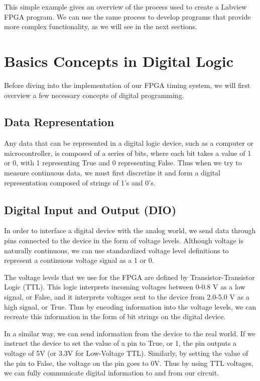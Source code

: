This simple example gives an overview of the process used to create a Labview FPGA program.  We can use the same process to develop programs that provide more complex functionality, as we will see in the next sections.

 
\section{Basics Concepts in Digital Logic}
Before diving into the implementation of our FPGA timing system, we will first overview a few necessary concepts of digital programming.

\subsection{Data Representation} 
Any data that can be represented in a digital logic device, such as a computer
or microcontroller, is composed of a series of bits, where each bit takes a
value of 1 or 0, with 1 representing True and 0 representing False.  Thus when we try to measure continuous data, we must first discretize it and form a digital representation composed of strings of 1's and 0's.

\subsection{Digital Input and Output (DIO)} 
In order to interface a digital device with the analog world, we send data
through pins connected to the device in the form of voltage levels.  Although
voltage is naturally continuous, we can use standardized voltage level
definitions to represent a continuous voltage signal as a 1 or 0.

The voltage levels that we use for the FPGA are defined by Transistor-Transistor Logic (TTL).  This logic interprets incoming voltages between 0-0.8 V as a low signal, or False, and it interprets voltages sent to the device from 2.0-5.0 V as a high signal, or True.  Thus by encoding information into the voltage levels, we can recreate this information in the form of bit strings on the digital device.

In a similar way, we can send information from the device to the real world.
If we instruct the device to set the value of a pin to True, or 1, the pin
outputs a voltage of 5V (or 3.3V for Low-Voltage TTL).  Similarly, by setting
the value of the pin to False, the voltage on the pin goes to 0V.  Thus by
using TTL voltages, we can fully communicate digital information to and from our circuit.

